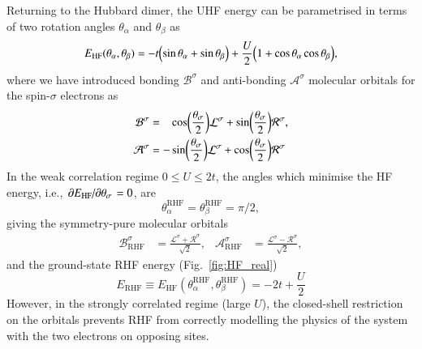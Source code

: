 \documentclass[aps,prb,reprint,noshowkeys,superscriptaddress]{revtex4-1}
\newcommand{\latin}[1]{#1}
\newcommand{\ie}{\latin{i.e.}}
\newcommand{\ta}{\theta_{\alpha}}
\newcommand{\tb}{\theta_{\beta}}
\newcommand{\Lsi}{\mathcal{L}^{\sigma}}
\newcommand{\Rsi}{\mathcal{R}^{\sigma}}
\begin{document}
Returning to the Hubbard dimer, the UHF energy can be parametrised in terms of two rotation angles $\ta$ and $\tb$ as
\begin{equation}
E_\text{HF}(\ta, \tb) = -t \qty( \sin \ta + \sin \tb ) + \frac{U}{2} \qty( 1 + \cos \ta \cos \tb ),
\end{equation}
where we have introduced bonding $\mathcal{B}^{\sigma}$ and anti-bonding $\mathcal{A}^{\sigma}$ molecular orbitals for 
the spin-$\sigma$ electrons as
\begin{align}
    \mathcal{B}^{\sigma} & = \hphantom{-} \cos(\frac{\theta_\sigma}{2}) \Lsi + \sin(\frac{\theta_\sigma}{2}) \Rsi,
	\\
	\mathcal{A}^{\sigma} & = - \sin(\frac{\theta_\sigma}{2}) \Lsi + \cos(\frac{\theta_\sigma}{2}) \Rsi
\end{align}
In the weak correlation regime $0 \le U \le 2t$, the angles which minimise the HF energy, 
\ie, $\pdv*{E_\text{HF}}{\theta_\sigma} = 0$, are 
\begin{equation}
	\ta^\text{RHF} = \tb^\text{RHF} = \pi/2,
\end{equation}
giving the symmetry-pure molecular orbitals
\begin{align}
	\mathcal{B}_\text{RHF}^{\sigma} & = \frac{\Lsi + \Rsi}{\sqrt{2}},
	&
	\mathcal{A}_\text{RHF}^{\sigma} & = \frac{\Lsi - \Rsi}{\sqrt{2}},
\end{align}
and the ground-state RHF energy (Fig.~\ref{fig:HF_real})
\begin{equation}
	E_\text{RHF} \equiv E_\text{HF}(\ta^\text{RHF}, \tb^\text{RHF}) = -2t + \frac{U}{2}
\end{equation}
However, in the strongly correlated regime (large $U$), the closed-shell restriction on the orbitals prevents RHF from 
correctly modelling the physics of the system with the two electrons on opposing sites.
\end{document}
